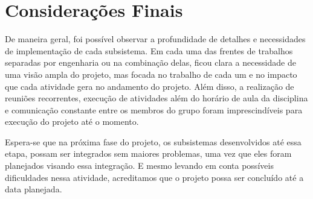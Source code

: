 \chapter[Considerações Finais]{Considerações Finais}

    De maneira geral, foi possível observar a profundidade de detalhes e necessidades de 
    implementação de cada subsistema. Em cada uma das frentes de trabalhos separadas por 
    engenharia ou na combinação delas, ficou clara a necessidade de uma visão ampla do projeto, 
    mas focada no trabalho de cada um e no impacto que cada atividade gera no andamento do 
    projeto. Além disso, a realização de reuniões recorrentes, execução de atividades além do 
    horário de aula da disciplina e comunicação constante entre os membros do grupo foram
    imprescindíveis para execução do projeto até o momento.


    Espera-se que na próxima fase do projeto, os subsistemas desenvolvidos até essa etapa, 
    possam ser integrados sem maiores problemas, uma vez que eles foram planejados visando essa 
    integração. E mesmo levando em conta possíveis dificuldades nessa atividade, acreditamos 
    que o projeto possa ser concluído até a data planejada.

